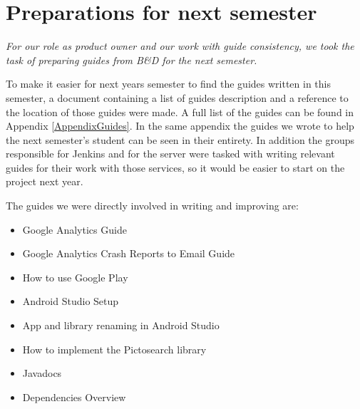 \section{Preparations for next semester}
\textit{For our role as product owner and our work with guide consistency, we took the task of preparing guides from B\&D for the next semester.}

To make it easier for next years semester to find the guides written in this semester, a document containing a list of guides description and a reference to the location of those guides were made. A full list of the guides can be found in Appendix \ref{AppendixGuides}.
In the same appendix the guides we wrote to help the next semester’s student can be seen in their entirety.
In addition the groups responsible for Jenkins and for the server were tasked with writing relevant guides for their work with those services, so it would be easier to start on the project next year.

The guides we were directly involved in writing and improving are:
\begin{itemize}
	\item Google Analytics Guide
	\item Google Analytics Crash Reports to Email Guide 
	\item How to use Google Play
	\item Android Studio Setup
	\item App and library renaming in Android Studio
	\item How to implement the Pictosearch library
	\item Javadocs
	\item Dependencies Overview
\end{itemize}
